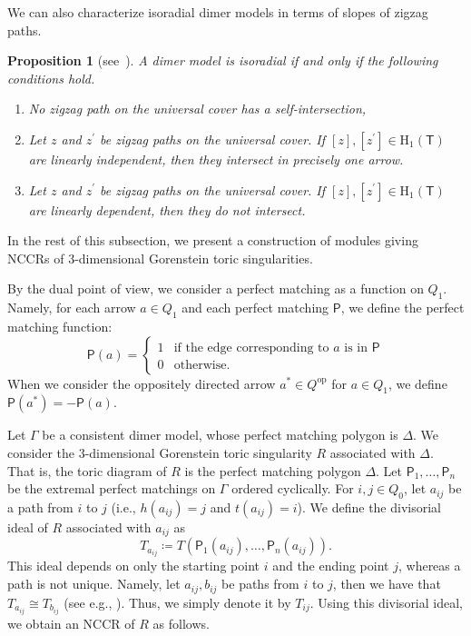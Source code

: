 \documentclass[11pt]{amsart}
\newtheorem{prop}[theo]{Proposition}
\theoremstyle{definition}
\newcommand{\rmH}{\mathrm{H}}
\newcommand{\sfP}{\mathsf{P}}
\newcommand{\sfT}{\mathsf{T}}
\DeclareMathOperator{\op}{op}
\begin{document}
We can also characterize isoradial dimer models in terms of slopes of zigzag paths.

\begin{prop}[{see~\cite[Propostion~3.12]{Bro}}]\label{slope_isoradial}
A dimer model is isoradial if and only if the following conditions hold.
\begin{enumerate}%
\item No zigzag path on the universal cover has a self-intersection,
\item Let $z$ and $z^\prime$ be zigzag paths on the universal cover. If $[z], [z^\prime]\in\rmH_1(\sfT)$ are linearly independent, then they intersect in precisely one arrow.
\item Let $z$ and $z^\prime$ be zigzag paths on the universal cover. If $[z], [z^\prime]\in\rmH_1(\sfT)$ are linearly dependent, then they do not intersect.
\end{enumerate}
\end{prop}


In the rest of this subsection, we present a construction of modules giving NCCRs of $3$-dimensional Gorenstein toric singularities.

By the dual point of view, we consider a perfect matching as a function on $Q_1$. Namely, for each arrow $a\in Q_1$ and each perfect matching $\sfP$, we define the perfect matching function:
\begin{equation}\label{pm_function}
\sfP(a)=%
\begin{cases}
1&\text{if the edge corresponding to $a$ is in $\sfP$}\\
0&\text{otherwise}. %
\end{cases} %
\end{equation}
When we consider the oppositely directed arrow $a^*\in Q^{\op}$ for $a\in Q_1$, we define $\sfP(a^*)=-\sfP(a)$.


Let $\Gamma$ be a consistent dimer model, whose perfect matching polygon is $\Delta$. We consider the $3$-dimensional Gorenstein toric singularity $R$ associated with $\Delta$. That is, the toric diagram of $R$ is the perfect matching polygon $\Delta$. Let $\sfP_1, \ldots, \sfP_n$ be the extremal perfect matchings on $\Gamma$ ordered cyclically. For $i, j\in Q_0$, let $a_{ij}$ be a path from $i$ to $j$ (i.e., $h(a_{ij})=j$ and $t(a_{ij})=i$). We define the divisorial ideal of $R$ associated with $a_{ij}$ as
\[
T_{a_{ij}}\coloneqq T(\sfP_1(a_{ij}), \ldots, \sfP_n(a_{ij})).
\]
This ideal depends on only the starting point $i$ and the ending point $j$, whereas a path is not unique. Namely, let $a_{ij}, b_{ij}$ be paths from $i$ to $j$, then we have that $T_{a_{ij}}\cong T_{b_{ij}}$ (see e.g., \cite[Lemma~3.7]{Nak}). Thus, we simply denote it by $T_{ij}$. Using this divisorial ideal, we obtain an NCCR of $R$ as follows.
\end{document}
